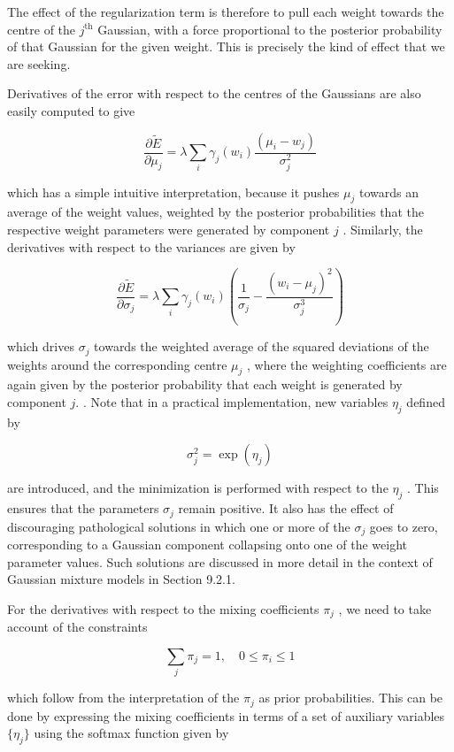 \documentclass[
  10
]{article}
\begin{document}
The effect of the regularization term is therefore to pull each weight
towards the centre of the \(j ^ { \mathrm { t h } }\) Gaussian, with a
force proportional to the posterior probability of that Gaussian for the
given weight. This is precisely the kind of effect that we are seeking.

Derivatives of the error with respect to the centres of the Gaussians
are also easily computed to give

\[
\frac {\partial \widetilde {E}}{\partial \mu_ {j}} = \lambda \sum_ {i} \gamma_ {j} (w _ {i}) \frac {(\mu_ {i} - w _ {j})}{\sigma_ {j} ^ {2}}\tag{5.142}
\]

which has a simple intuitive interpretation, because it pushes
\(\mu _ { j }\) towards an average of the weight values, weighted by the
posterior probabilities that the respective weight parameters were
generated by component \(j\) . Similarly, the derivatives with respect
to the variances are given by

\[
\frac {\partial \widetilde {E}}{\partial \sigma_ {j}} = \lambda \sum_ {i} \gamma_ {j} (w _ {i}) \left(\frac {1}{\sigma_ {j}} - \frac {(w _ {i} - \mu_ {j}) ^ {2}}{\sigma_ {j} ^ {3}}\right)\tag{5.143}
\]

which drives \(\sigma _ { j }\) towards the weighted average of the
squared deviations of the weights around the corresponding centre
\(\mu _ { j }\) , where the weighting coefficients are again given by
the posterior probability that each weight is generated by component
\(j .\) . Note that in a practical implementation, new variables
\(\eta _ { j }\) defined by

\[
\sigma_ {j} ^ {2} = \exp (\eta_ {j})\tag{5.144}
\]

are introduced, and the minimization is performed with respect to the
\(\eta _ { j }\) . This ensures that the parameters \(\sigma _ { j }\)
remain positive. It also has the effect of discouraging pathological
solutions in which one or more of the \(\sigma _ { j }\) goes to zero,
corresponding to a Gaussian component collapsing onto one of the weight
parameter values. Such solutions are discussed in more detail in the
context of Gaussian mixture models in Section 9.2.1.

For the derivatives with respect to the mixing coefficients
\(\pi _ { j }\) , we need to take account of the constraints

\[
\sum_ {j} \pi_ {j} = 1, \quad 0 \leqslant \pi_ {i} \leqslant 1\tag{5.145}
\]

which follow from the interpretation of the \(\pi _ { j }\) as prior
probabilities. This can be done by expressing the mixing coefficients in
terms of a set of auxiliary variables \(\{ \eta _ { j } \}\) using the
softmax function given by
\end{document}
